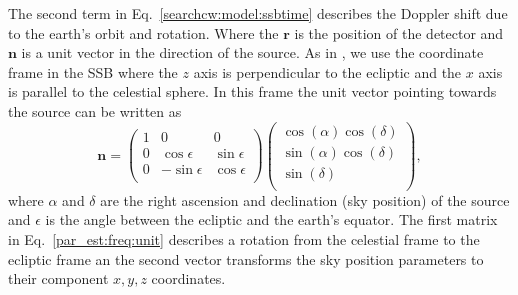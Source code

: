 The second term in Eq.~\ref{searchcw:model:ssbtime} describes the Doppler shift
due to the earth's orbit and rotation.  Where the $\bm{r}$ is the position of
the detector and $\bm{n}$ is a unit vector in the direction of the source.  As
in \citep{schutz1998DataAnalysis}, we use the coordinate frame in the \gls{SSB}
where the $z$ axis is perpendicular to the ecliptic and the $x$ axis is
parallel to the celestial sphere.  In this frame the unit vector pointing
towards the source can be written as
%
\begin{equation}
    \label{par_est:freq:unit}
    \bm{n} = 
    \left(
    \begin{matrix}
        1 & 0 & 0  \\
        0 & \cos \epsilon & \sin \epsilon \\
        0 & -\sin \epsilon & \cos \epsilon \\
    \end{matrix} \right)
    \left(
    \begin{matrix}
        \cos(\alpha)\cos(\delta)  \\
        \sin(\alpha)\cos(\delta) \\
        \sin(\delta) \\
    \end{matrix} \right),
\end{equation}
%
where $\alpha$ and $\delta$ are the right ascension and declination (sky
position) of the source and $\epsilon$ is the angle between the ecliptic and
the earth's equator.  The first matrix in Eq.~\ref{par_est:freq:unit} describes
a rotation from the celestial frame to
the ecliptic frame an the second vector transforms the sky position parameters to their component
$x,y,z$ coordinates.

